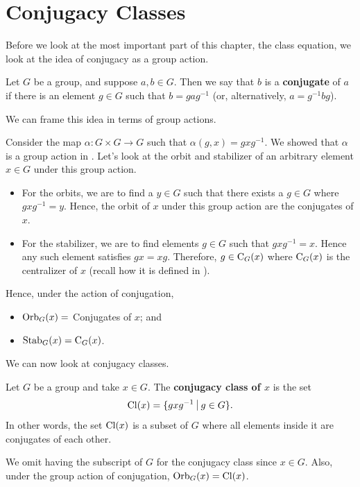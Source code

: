 \newpage

\section{Conjugacy Classes}
Before we look at the most important part of this chapter, the class equation, we look at the idea of conjugacy as a group action.
\begin{definition}
    Let $G$ be a group, and suppose $a, b \in G$. Then we say that $b$ is a \textbf{conjugate} of $a$ if there is an element $g \in G$ such that $b = gag^{-1}$ (or, alternatively, $a=g^{-1}bg$).
\end{definition}
We can frame this idea in terms of group actions.

Consider the map $\alpha: G\times G\to G$ such that $\alpha(g, x) = gxg^{-1}$. We showed that $\alpha$ is a group action in . Let's look at the orbit and stabilizer of an arbitrary element $x \in G$ under this group action.
\begin{itemize}
    \item For the orbits, we are to find a $y \in G$ such that there exists a $g \in G$ where $gxg^{-1} = y$. Hence, the orbit of $x$ under this group action are the conjugates of $x$.
    \item For the stabilizer, we are to find elements $g \in G$ such that $gxg^{-1} = x$. Hence any such element satisfies $gx = xg$. Therefore, $g \in \mathrm{C}_{G}(x)$ where $\mathrm{C}_{G}(x)$ is the centralizer of $x$ (recall how it is defined in ).
\end{itemize}

Hence, under the action of conjugation,
\begin{itemize}
    \item $\mathrm{Orb}_{G}(x) = $ Conjugates of $x$; and
    \item $\mathrm{Stab}_{G}(x) = \mathrm{C}_{G}(x)$.
\end{itemize}

\newpage

We can now look at conjugacy classes.
\begin{definition}
    Let $G$ be a group and take $x \in G$. The \textbf{conjugacy class of $x$} is the set
    \[
        \Cl{x} = \{gxg^{-1} \vert g \in G\}.
    \]
    In other words, the set $\mathrm{Cl}(x)$ is a subset of $G$ where all elements inside it are conjugates of each other.
\end{definition}
\begin{remark}
    We omit having the subscript of $G$ for the conjugacy class since $x \in G$. Also, under the group action of conjugation, $\mathrm{Orb}_{G}(x) = \mathrm{Cl}(x)$.
\end{remark}

